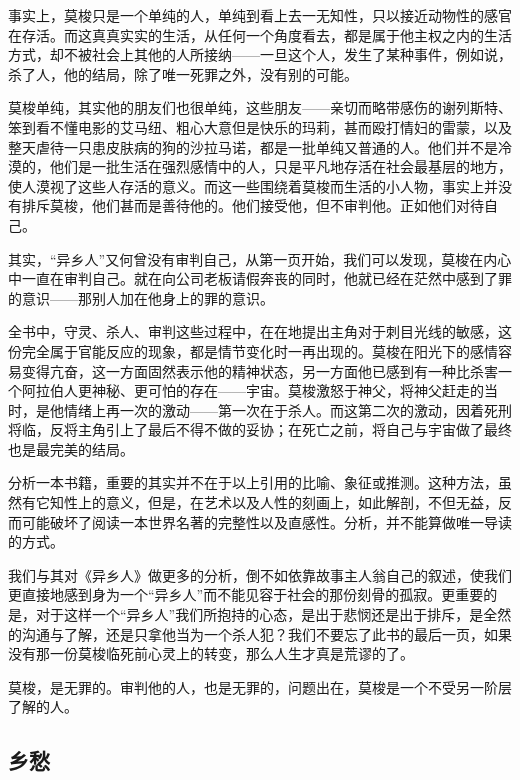 \par 事实上，莫梭只是一个单纯的人，单纯到看上去一无知性，只以接近动物性的感官在存活。而这真真实实的生活，从任何一个角度看去，都是属于他主权之内的生活方式，却不被社会上其他的人所接纳——一旦这个人，发生了某种事件，例如说，杀了人，他的结局，除了唯一死罪之外，没有别的可能。
\par 莫梭单纯，其实他的朋友们也很单纯，这些朋友——亲切而略带感伤的谢列斯特、笨到看不懂电影的艾马纽、粗心大意但是快乐的玛莉，甚而殴打情妇的雷蒙，以及整天虐待一只患皮肤病的狗的沙拉马诺，都是一批单纯又普通的人。他们并不是冷漠的，他们是一批生活在强烈感情中的人，只是平凡地存活在社会最基层的地方，使人漠视了这些人存活的意义。而这一些围绕着莫梭而生活的小人物，事实上并没有排斥莫梭，他们甚而是善待他的。他们接受他，但不审判他。正如他们对待自己。
\par 其实，“异乡人”又何曾没有审判自己，从第一页开始，我们可以发现，莫梭在内心中一直在审判自己。就在向公司老板请假奔丧的同时，他就已经在茫然中感到了罪的意识——那别人加在他身上的罪的意识。
\par 全书中，守灵、杀人、审判这些过程中，在在地提出主角对于刺目光线的敏感，这份完全属于官能反应的现象，都是情节变化时一再出现的。莫梭在阳光下的感情容易变得亢奋，这一方面固然表示他的精神状态，另一方面他已感到有一种比杀害一个阿拉伯人更神秘、更可怕的存在——宇宙。莫梭激怒于神父，将神父赶走的当时，是他情绪上再一次的激动——第一次在于杀人。而这第二次的激动，因着死刑将临，反将主角引上了最后不得不做的妥协；在死亡之前，将自己与宇宙做了最终也是最完美的结局。
\par 分析一本书籍，重要的其实并不在于以上引用的比喻、象征或推测。这种方法，虽然有它知性上的意义，但是，在艺术以及人性的刻画上，如此解剖，不但无益，反而可能破坏了阅读一本世界名著的完整性以及直感性。分析，并不能算做唯一导读的方式。
\par 我们与其对《异乡人》做更多的分析，倒不如依靠故事主人翁自己的叙述，使我们更直接地感到身为一个“异乡人”而不能见容于社会的那份刻骨的孤寂。更重要的是，对于这样一个“异乡人”我们所抱持的心态，是出于悲悯还是出于排斥，是全然的沟通与了解，还是只拿他当为一个杀人犯？我们不要忘了此书的最后一页，如果没有那一份莫梭临死前心灵上的转变，那么人生才真是荒谬的了。
\par 莫梭，是无罪的。审判他的人，也是无罪的，问题出在，莫梭是一个不受另一阶层了解的人。



\subsection{乡愁}


